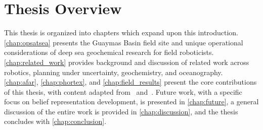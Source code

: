 \section{Thesis Overview}
This thesis is organized into chapters which expand upon this introduction. \cref{chap:opsatsea} presents the Guaymas Basin field site and unique operational considerations of deep sea geochemical research for field roboticists. \cref{chap:related_work} provides background and discussion of related work across robotics, planning under uncertainty, geochemistry, and oceanography. \cref{chap:afar}, \cref{chap:phortex}, and \cref{chap:field_results} present the core contributions of this thesis, with content adapted from~\cite{preston2022discovering} and~\cite{preston2022physically}. Future work, with a specific focus on belief representation development, is presented in \cref{chap:future}, a general discussion of the entire work is provided in \cref{chap:discussion}, and the thesis concludes with \cref{chap:conclusion}.

